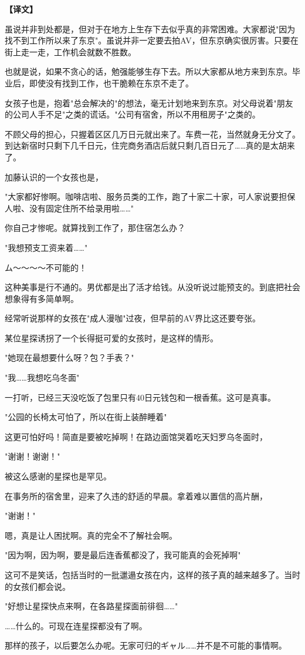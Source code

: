 \documentclass[12pt,UTF8]{ctexbook}
\begin{document}
\vspace{2ex}
\parbox{0.9\linewidth}{
\textbf{【译文】}\par

虽说并非到处都是，但对于在地方上生存下去似乎真的非常困难。大家都说"因为找不到工作所以来了东京"。虽说并非一定要去拍AV，但东京确实很厉害。只要在街上走一走，工作机会就数不胜数。

也就是说，如果不贪心的话，勉强能够生存下去。所以大家都从地方来到东京。毕业后，即使没有找到工作，也干脆赖在东京不走了。

女孩子也是，抱着"总会解决的"的想法，毫无计划地来到东京。对父母说着"朋友的公司人手不足"之类的谎话。"公司有宿舍，所以不用租房子"之类的。

不顾父母的担心，只握着区区几万日元就出来了。车费一花，当然就身无分文了。到达新宿时只剩下几千日元，住完商务酒店后就只剩几百日元了……真的是太胡来了。

加藤认识的一个女孩也是，

"大家都好惨啊。咖啡店啦、服务员类的工作，跑了十家二十家，可人家说要担保人啦、没有固定住所不给录用啦……"

你自己才惨呢。就算找到工作了，那住宿怎么办？

"我想预支工资来着……"

ム～～～～不可能的！

这种美事是行不通的。男优都是出了活才给钱。从没听说过能预支的。到底把社会想象得有多简单啊。

经常听说那样的女孩在"成人漫咖"过夜，但早前的AV界比这还要夸张。

某位星探诱拐了一个长得挺可爱的女孩时，是这样的情形。

"她现在最想要什么呀？包？手表？"

"我……我想吃乌冬面"

一打听，已经三天没吃饭了包里只有40日元钱包和一根香蕉。这可是真事。

"公园的长椅太可怕了，所以在街上装醉睡着"

这更可怕好吗！简直是要被吃掉啊！在路边面馆哭着吃天妇罗乌冬面时，

"谢谢！谢谢！"

被这么感谢的星探也是罕见。

在事务所的宿舍里，迎来了久违的舒适的早晨。拿着难以置信的高片酬，

"谢谢！"

嗯，真是让人困扰啊。真的完全不了解社会啊。

"因为啊，因为啊，要是最后连香蕉都没了，我可能真的会死掉啊"

这可不是笑话，包括当时的一批邋遢女孩在内，这样的孩子真的越来越多了。当时的女孩们都会说。

"好想让星探快点来啊，在各路星探面前徘徊……"

……什么的。可现在连星探都没有了啊。

那样的孩子，以后要怎么办呢。无家可归的ギャル……并不是不可能的事情啊。
}
\end{document}
